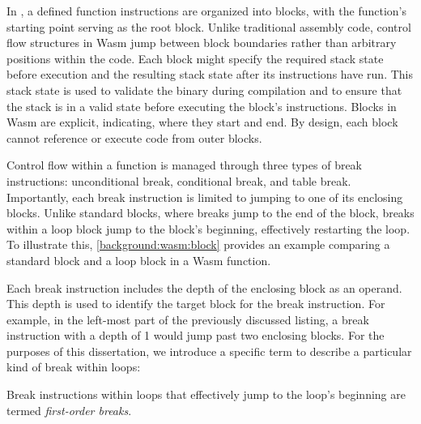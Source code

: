 
In \Wasm, a defined function instructions are organized into blocks, with the function's starting point serving as the root block. 
Unlike traditional assembly code, control flow structures in Wasm jump between block boundaries rather than arbitrary positions within the code. 
Each block might specify the required stack state before execution and the resulting stack state after its instructions have run. 
This stack state is used to validate the binary during compilation and to ensure that the stack is in a valid state before executing the block's instructions.
Blocks in Wasm are explicit, indicating, where they start and end.
By design, each block cannot reference or execute code from outer blocks.

Control flow within a function is managed through three types of break instructions: unconditional break, conditional break, and table break. 
Importantly, each break instruction is limited to jumping to one of its enclosing blocks.
Unlike standard blocks, where breaks jump to the end of the block, breaks within a loop block jump to the block's beginning, effectively restarting the loop. 
To illustrate this, \autoref{background:wasm:block} provides an example comparing a standard block and a loop block in a Wasm function.



Each break instruction includes the depth of the enclosing block as an operand. 
This depth is used to identify the target block for the break instruction. 
For example, in the left-most part of the previously discussed listing, a break instruction with a depth of 1 would jump past two enclosing blocks.
For the purposes of this dissertation, we introduce a specific term to describe a particular kind of break within loops:

\begin{definition}\label{first_order_jump}
Break instructions within loops that effectively jump to the loop's beginning are termed \emph{first-order breaks}.
\end{definition}


\label{background:wasm:ecosystems}



